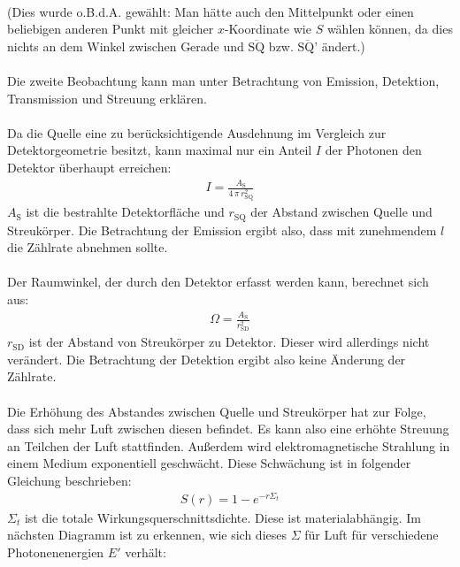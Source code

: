\documentclass[german,  %
parskip=full,  %
]{scrartcl}
\begin{document}
\\
(Dies wurde o.B.d.A. gewählt: Man hätte auch den Mittelpunkt oder einen beliebigen anderen Punkt mit gleicher $x$-Koordinate wie $S$ wählen können, da dies nichts an dem Winkel zwischen Gerade und $\overline{\text{SQ}}$ bzw. $\overline{\text{SQ'}}$ ändert.)
\\\\
Die zweite Beobachtung kann man unter Betrachtung von Emission, Detektion, Transmission und Streuung erklären.
\\\\
Da die Quelle eine zu berücksichtigende Ausdehnung im Vergleich zur Detektorgeometrie besitzt, kann maximal nur ein Anteil $I$ der Photonen den Detektor überhaupt erreichen:
\begin{align}
I = \frac{A_{\text{S}}}{4 \, \pi \, r_{\text{SQ}}^2}
\end{align}
$A_{\text{S}}$ ist die bestrahlte Detektorfläche und $r_{\text{SQ}}$ der Abstand zwischen Quelle und Streukörper. Die Betrachtung der Emission ergibt also, dass mit zunehmendem $l$ die Zählrate abnehmen sollte.
\\\\
Der Raumwinkel, der durch den Detektor erfasst werden kann, berechnet sich aus:
\begin{align}
\Omega = \frac{A_{\text{S}}}{r_{\text{SD}}^2}
\end{align}
$r_{\text{SD}}$ ist der Abstand von Streukörper zu Detektor. Dieser wird allerdings nicht verändert. Die Betrachtung der Detektion ergibt also keine Änderung der Zählrate.
\\\\
Die Erhöhung des Abstandes zwischen Quelle und Streukörper hat zur Folge, dass sich mehr Luft zwischen diesen befindet. Es kann also eine erhöhte Streuung an Teilchen der Luft stattfinden. Außerdem wird elektromagnetische Strahlung in einem Medium exponentiell geschwächt. Diese Schwächung ist in folgender Gleichung beschrieben:
\begin{align}
S(r) = 1- e^{-r\Sigma_{t}}
\end{align}
$\Sigma_{t}$ ist die totale Wirkungsquerschnittsdichte. Diese ist materialabhängig. Im nächsten Diagramm ist zu erkennen, wie sich dieses $\Sigma$ für Luft für verschiedene Photonenenergien $E'$ verhält:
\\
\end{document}
